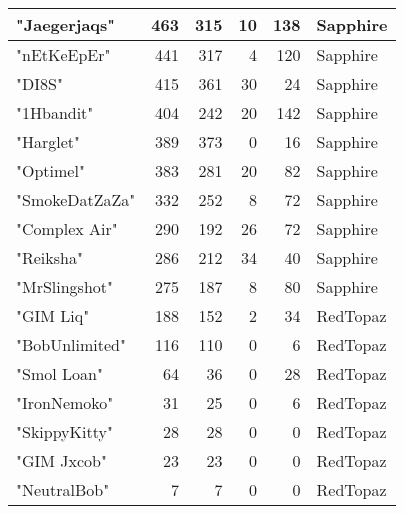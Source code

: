 \documentclass{article}
\begin{document}
\begin{table}[htbp]
\begin{tabular}{|l|r|r|r|r|l|}
"Jaegerjaqs" & 463 & 315 & 10 & 138 & Sapphire \\ \hline
"nEtKeEpEr" & 441 & 317 & 4 & 120 & Sapphire \\ \hline
"DI8S" & 415 & 361 & 30 & 24 & Sapphire \\ \hline
"1Hbandit" & 404 & 242 & 20 & 142 & Sapphire \\ \hline
"Harglet" & 389 & 373 & 0 & 16 & Sapphire \\ \hline
"Optimel" & 383 & 281 & 20 & 82 & Sapphire \\ \hline
"SmokeDatZaZa" & 332 & 252 & 8 & 72 & Sapphire \\ \hline
"Complex Air" & 290 & 192 & 26 & 72 & Sapphire \\ \hline
"Reiksha" & 286 & 212 & 34 & 40 & Sapphire \\ \hline
"MrSlingshot" & 275 & 187 & 8 & 80 & Sapphire \\ \hline
"GIM Liq" & 188 & 152 & 2 & 34 & RedTopaz \\ \hline
"BobUnlimited" & 116 & 110 & 0 & 6 & RedTopaz \\ \hline
"Smol Loan" & 64 & 36 & 0 & 28 & RedTopaz \\ \hline
"IronNemoko" & 31 & 25 & 0 & 6 & RedTopaz \\ \hline
"SkippyKitty" & 28 & 28 & 0 & 0 & RedTopaz \\ \hline
"GIM Jxcob" & 23 & 23 & 0 & 0 & RedTopaz \\ \hline
"NeutralBob" & 7 & 7 & 0 & 0 & RedTopaz \\ \hline
\end{tabular}
\end{table}
\end{document}
